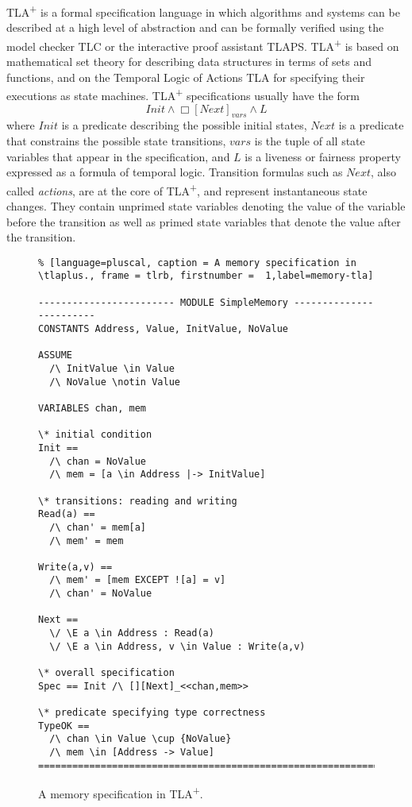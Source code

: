 \documentclass{article}
\newcommand{\tlaplus}{TLA\textsuperscript{+}\xspace}
\begin{document}
\tlaplus is a formal specification language in which algorithms and systems can be described at a high level of abstraction and can be formally verified using the model checker TLC or the interactive proof assistant TLAPS. \tlaplus is based on mathematical set theory for describing data structures in terms of sets and functions, and on the Temporal Logic of Actions TLA for specifying their executions as state machines. \tlaplus specifications usually have the form
\[
  Init \land \Box[Next]_{vars} \land L
\]
where $Init$ is a predicate describing the possible initial states, $Next$ is a predicate that constrains the possible state transitions, $vars$ is the tuple of all state variables that appear in the specification, and $L$ is a liveness or fairness property expressed as a formula of temporal logic. Transition formulas such as $Next$, also called \emph{actions}, are at the core of \tlaplus, and represent instantaneous state changes. They contain unprimed state variables denoting the value of the variable before the transition as well as primed state variables that denote the value after the transition.

\begin{figure}
\begin{lstlisting}% [language=pluscal, caption = A memory specification in \tlaplus., frame = tlrb, firstnumber =  1,label=memory-tla]

------------------------ MODULE SimpleMemory ------------------------
CONSTANTS Address, Value, InitValue, NoValue

ASSUME 
  /\ InitValue \in Value
  /\ NoValue \notin Value

VARIABLES chan, mem

\* initial condition
Init == 
  /\ chan = NoValue
  /\ mem = [a \in Address |-> InitValue]

\* transitions: reading and writing
Read(a) == 
  /\ chan' = mem[a]
  /\ mem' = mem

Write(a,v) ==
  /\ mem' = [mem EXCEPT ![a] = v]
  /\ chan' = NoValue

Next ==
  \/ \E a \in Address : Read(a)
  \/ \E a \in Address, v \in Value : Write(a,v)

\* overall specification
Spec == Init /\ [][Next]_<<chan,mem>>

\* predicate specifying type correctness
TypeOK == 
  /\ chan \in Value \cup {NoValue}
  /\ mem \in [Address -> Value] 
=====================================================================
\end{lstlisting}
\caption{A memory specification in \tlaplus.}
\label{memory-tla}
\end{figure}
\end{document}
